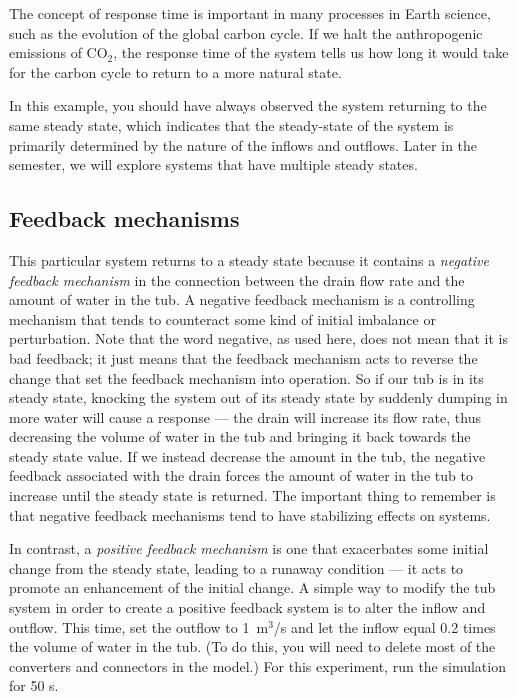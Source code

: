 \documentclass[11pt,letterpaper]{article}
\begin{document}
The concept of response time is important in many processes in Earth science, such as the evolution of the global carbon cycle. If we halt the anthropogenic emissions of CO$_2$, the response time of the system tells us how long it would take for the carbon cycle to return to a more natural state.

In this example, you should have always observed the system returning to the same steady state, which indicates that the steady-state of the system is primarily determined by the nature of the inflows and outflows. Later in the semester, we will explore systems that have multiple steady states.

\subsection{Feedback mechanisms}
This particular system returns to a steady state because it contains a \textit{negative feedback mechanism} in the connection between the drain flow rate and the amount of water in the tub. A negative feedback mechanism is a controlling mechanism that tends to counteract some kind of initial imbalance or perturbation. Note that the word negative, as used here, does not mean that it is bad feedback; it just means that the feedback mechanism acts to reverse the change that set the feedback mechanism into operation. So if our tub is in its steady state, knocking the system out of its steady state by suddenly dumping in more water will cause a response --- the drain will increase its flow rate, thus decreasing the volume of water in the tub and bringing it back towards the steady state value. If we instead decrease the amount in the tub, the negative feedback associated with the drain forces the amount of water in the tub to increase until the steady state is returned. The important thing to remember is that negative feedback mechanisms tend to have stabilizing effects on systems.

In contrast, a \textit{positive feedback mechanism} is one that exacerbates some initial change from the steady state, leading to a runaway condition --- it acts to promote an enhancement of the initial change. A simple way to modify the tub system in order to create a positive feedback system is to alter the inflow and outflow. This time, set the outflow to 1~m$^3$/s and let the inflow equal 0.2 times the volume of water in the tub. (To do this, you will need to delete most of the converters and connectors in the model.) For this experiment, run the simulation for 50 s.
\end{document}
